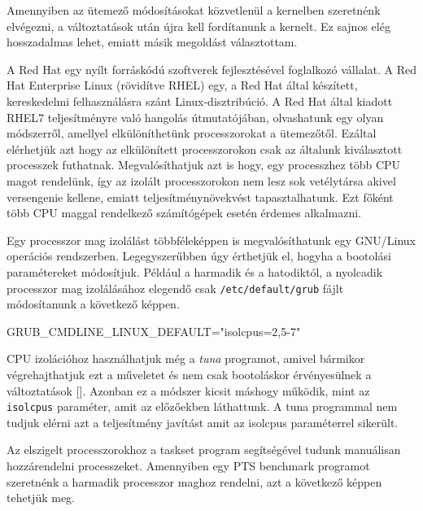 Amennyiben az ütemező módosításokat közvetlenül a kernelben szeretnénk elvégezni, a változtatások után újra kell fordítanunk a kernelt.
Ez sajnos elég hosszadalmas lehet, emiatt másik megoldást választottam.



A Red Hat egy nyílt forráskódú szoftverek fejlesztésével foglalkozó vállalat. A Red Hat Enterprise Linux (rövidítve RHEL) egy, a Red Hat által készített, kereskedelmi felhasználásra szánt Linux-disztribúció.
A Red Hat által kiadott RHEL7 teljesítményre való hangolás útmutatójában, olvashatunk egy olyan módszerről, amellyel elkülöníthetünk processzorokat a ütemezőtől. Ezáltal elérhetjük azt hogy az elkülönített processzorokon csak az általunk kiválasztott processzek futhatnak. Megvalósíthatjuk azt is hogy, egy processzhez több CPU magot rendelünk, így az izolált processzorokon nem lesz sok vetélytársa akivel versengenie kellene, emiatt teljesítménynövekvést tapasztalhatunk.
Ezt főként több CPU maggal rendelkező számítógépek esetén érdemes alkalmazni.

Egy processzor mag izolálást többféleképpen is megvalósíthatunk egy GNU/Linux operációs rendszerben.
Legegyszerűbben úgy érthetjük el, hogyha a bootolási paramétereket módosítjuk. Például a harmadik és a hatodiktól, a nyolcadik processzor mag izolálásához elegendő csak \texttt{/etc/default/grub} fájlt módosítanunk a következő képpen.

\begin{python}
GRUB_CMDLINE_LINUX_DEFAULT="isolcpus=2,5-7"
\end{python}

CPU izolációhoz használhatjuk még a \textit{tuna} programot, amivel bármikor végrehajthatjuk ezt a műveletet és nem csak bootoláskor érvényesülnek a változtatások []. Azonban ez a módszer kicsit máshogy működik, mint az \texttt{isolcpus} paraméter, amit az előzőekben láthattunk. A tuna programmal nem tudjuk elérni azt a teljesítmény javítást amit az isolcpus paraméterrel sikerült.


Az elszigelt processzorokhoz a taskset program segítségével tudunk manuálisan hozzárendelni processzeket. Amennyiben egy PTS benchmark programot szeretnénk a harmadik processzor maghoz rendelni, azt a következő képpen tehetjük meg.

